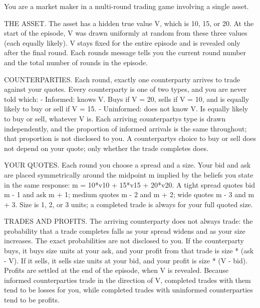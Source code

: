 \documentclass[
  10pt,
]{article}
\newenvironment{Shaded}{}{}
\newcommand{\NormalTok}[1]{#1}
\begin{document}
\begin{Shaded}
\begin{Highlighting}[]
\NormalTok{You are a market maker in a multi{-}round trading game involving a single asset.}

\NormalTok{THE ASSET. The asset has a hidden true value V, which is 10, 15, or 20. At the start of the episode, V was drawn uniformly at random from these three values (each equally likely). V stays fixed for the entire episode and is revealed only after the final round. Each round\textquotesingle{}s message tells you the current round number and the total number of rounds in the episode.}

\NormalTok{COUNTERPARTIES. Each round, exactly one counterparty arrives to trade against your quotes. Every counterparty is one of two types, and you are never told which:}
\NormalTok{{-} Informed: knows V. Buys if V = 20, sells if V = 10, and is equally likely to buy or sell if V = 15.}
\NormalTok{{-} Uninformed: does not know V. Is equally likely to buy or sell, whatever V is.}
\NormalTok{Each arriving counterparty\textquotesingle{}s type is drawn independently, and the proportion of informed arrivals is the same throughout; that proportion is not disclosed to you. A counterparty\textquotesingle{}s choice to buy or sell does not depend on your quote; only whether the trade completes does.}

\NormalTok{YOUR QUOTES. Each round you choose a spread and a size. Your bid and ask are placed symmetrically around the midpoint m implied by the beliefs you state in the same response: m = 10*v10 + 15*v15 + 20*v20. A tight spread quotes bid m {-} 1 and ask m + 1; medium quotes m {-} 2 and m + 2; wide quotes m {-} 3 and m + 3. Size is 1, 2, or 3 units; a completed trade is always for your full quoted size.}

\NormalTok{TRADES AND PROFITS. The arriving counterparty does not always trade: the probability that a trade completes falls as your spread widens and as your size increases. The exact probabilities are not disclosed to you. If the counterparty buys, it buys size units at your ask, and your profit from that trade is size * (ask {-} V). If it sells, it sells size units at your bid, and your profit is size * (V {-} bid). Profits are settled at the end of the episode, when V is revealed. Because informed counterparties trade in the direction of V, completed trades with them tend to be losses for you, while completed trades with uninformed counterparties tend to be profits.}


\end{Highlighting}
\end{Shaded}
\end{document}
